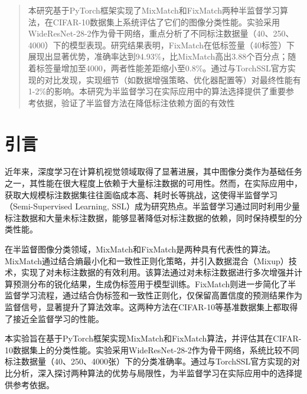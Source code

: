 \documentclass[a4paper, utf8]{ctexart}
\begin{document}
	\maketitle
	
	\renewcommand{\abstractname}{\large \textbf{摘要}}
	\begin{abstract}
		本研究基于PyTorch框架实现了MixMatch和FixMatch两种半监督学习算法，在CIFAR-10数据集上系统评估了它们的图像分类性能。实验采用WideResNet-28-2作为骨干网络，重点分析了不同标注数据量（40、250、4000）下的模型表现。研究结果表明，FixMatch在低标签量（40标签）下展现出显著优势，准确率达到94.93\%，比MixMatch高出3.88个百分点；随着标签量增加至4000，两者性能差距缩小至0.8\%。通过与TorchSSL官方实现的对比发现，实现细节（如数据增强策略、优化器配置等）对最终性能有1-2\%的影响。本研究为半监督学习在实际应用中的算法选择提供了重要参考依据，验证了半监督方法在降低标注依赖方面的有效性
		
	\end{abstract}
	
	\section{引言}
	
	近年来，深度学习在计算机视觉领域取得了显著进展，其中图像分类作为基础任务之一，其性能在很大程度上依赖于大量标注数据的可用性。然而，在实际应用中，获取大规模标注数据集往往面临成本高、耗时长等挑战，这使得半监督学习（Semi-Supervised Learning, SSL）成为研究热点。半监督学习通过同时利用少量标注数据和大量未标注数据，能够显著降低对标注数据的依赖，同时保持模型的分类性能\cite{mixmatch}。
	
	在半监督图像分类领域，MixMatch\cite{mixmatch}和FixMatch\cite{fixmatch}是两种具有代表性的算法。MixMatch通过结合熵最小化和一致性正则化策略，并引入数据混合（Mixup）技术，实现了对未标注数据的有效利用。该算法通过对未标注数据进行多次增强并计算预测分布的锐化结果，生成伪标签用于模型训练。FixMatch则进一步简化了半监督学习流程，通过结合伪标签和一致性正则化，仅保留高置信度的预测结果作为监督信号，显著提升了算法效率。这两种方法在CIFAR-10等基准数据集上都取得了接近全监督学习的性能\cite{fixmatch}。
	
	本实验旨在基于PyTorch框架实现MixMatch和FixMatch算法，并评估其在CIFAR-10数据集上的分类性能。实验采用WideResNet-28-2\cite{wrn}作为骨干网络，系统比较不同标注数据量（40、250、4000张）下的分类准确率。通过与TorchSSL官方实现的对比分析，深入探讨两种算法的优势与局限性，为半监督学习在实际应用中的选择提供参考依据。
	
\end{document}
